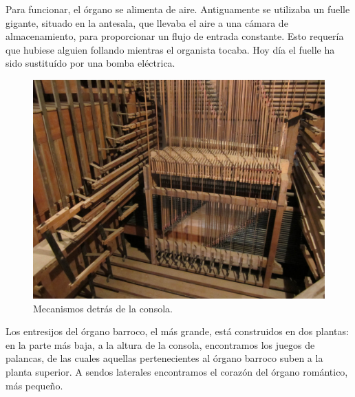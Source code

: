 \smallskip

Para funcionar, el órgano se alimenta de aire. Antiguamente se utilizaba un fuelle gigante, situado en la antesala, que llevaba el aire a una cámara de almacenamiento, para proporcionar un flujo de entrada constante. Esto requería que hubiese alguien follando mientras el organista tocaba. Hoy día el fuelle ha sido sustituído por una bomba eléctrica.

\smallskip

\begin{figure}[H]
	\noindent \begin{centering}
		\includegraphics[width=\linewidth*3/4]{capitulo3/mecanismos}
		\par\end{centering}
	\smallskip
	\caption{\label{fig:mecanismos} Mecanismos detrás de la consola.}
\end{figure} 

\smallskip

Los entresijos del órgano barroco, el más grande, está construidos en dos plantas: en la parte más baja, a la altura de la consola, encontramos los juegos de palancas, de las cuales aquellas pertenecientes al órgano barroco suben a la planta superior. A sendos laterales encontramos el corazón del órgano romántico, más pequeño.

\smallskip

